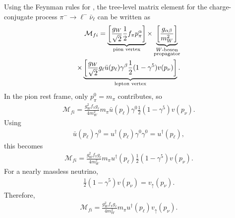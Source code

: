 Using the Feynman rules for , the
tree-level matrix element for the charge-conjugate process
\(\pi^- \to \ell^- \bar{\nu}_\ell\) can be written as
\begin{align}
\mathcal{M}_{fi}
=
\underbrace{
\left[
\frac{g_W}{\sqrt{2}}\frac{1}{2} f_\pi p_\pi^\alpha
\right]
}_{\text{pion vertex}}
\times
\underbrace{
\left[
\frac{g_{\alpha\beta}}{m_W^2}
\right]
}_{\substack{W\text{-boson}\\\text{propagator}}}
\notag\\
\times{}
\underbrace{
\left[
\frac{g_W}{\sqrt{2}}g_\ell
\bar{u}(p_\ell)\gamma^\beta
\frac{1}{2}(1-\gamma^5)v(p_\nu)
\right]
}_{\text{lepton vertex}} .
\end{align}
In the pion rest frame, only \(p_\pi^0=m_\pi\) contributes, so
\begin{align}
\mathcal{M}_{fi}
=
\frac{g_W^2 f_\pi g_\ell}{4m_W^2}
m_\pi
\bar{u}(p_\ell)\gamma^0
\frac{1}{2}(1-\gamma^5)v(p_\nu).
\end{align}
Using
\begin{align}
\bar{u}(p_\ell)\gamma^0
=
u^\dagger(p_\ell)\gamma^0\gamma^0
=
u^\dagger(p_\ell),
\end{align}
this becomes
\begin{align}
\mathcal{M}_{fi}
=
\frac{g_W^2 f_\pi g_\ell}{4m_W^2}
m_\pi
u^\dagger(p_\ell)
\frac{1}{2}(1-\gamma^5)v(p_\nu).
\end{align}
For a nearly massless neutrino,
\begin{align}
\frac{1}{2}(1-\gamma^5)v(p_\nu)
=
v_\uparrow(p_\nu).
\end{align}
Therefore,
\begin{align}
\mathcal{M}_{fi}
=
\frac{g_W^2 f_\pi g_\ell}{4m_W^2}
m_\pi
u^\dagger(p_\ell)v_\uparrow(p_\nu).
\end{align}

